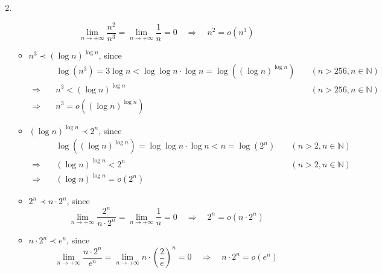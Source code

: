 \documentclass[12pt,a4paper]{article}
\makeatletter
\newtheorem*{solution}{Solution}
\theoremstyle{definition}
\renewenvironment{solution}[1][Solution] {\par\pushQED{\qed}\normalfont\topsep6\p@\@plus6\p@\relax\trivlist\item[\hskip\labelsep\bfseries#1\@addpunct{.}]\ignorespaces}{\popQED\endtrivlist\@endpefalse} \makeatother
\makeatother
\begin{document}
\begin{enumerate}
\begin{solution}
\begin{itemize}
            \begin{displaymath}
            \lim_{n \rightarrow +\infty} \frac{n^2}{n^3} = \lim_{n \rightarrow +\infty} \frac{1}{n} = 0 \quad \Longrightarrow \quad n^2 = o(n^3)
            \end{displaymath}
        \item $n^3 \prec (\log{n})^{\log{n}}$, since
            \begin{displaymath}
            \begin{aligned}
            & \quad \log{(n^3)} = 3\log{n} < \log{\log{n}} \cdot \log{n} = \log{\left((\log{n})^{\log{n}}\right)}\quad &(n > 256, n \in \mathbb{N})\\
            \Longrightarrow & \quad n^3 < (\log{n})^{\log{n}} \quad &(n > 256, n \in \mathbb{N})\\
            \Longrightarrow & \quad n^3 = o((\log{n})^{\log{n}})
            \end{aligned}
            \end{displaymath}
        \item $(\log{n})^{\log{n}} \prec 2^n$, since
            \begin{displaymath}
            \begin{aligned}
            & \quad \log{\left((\log{n})^{\log{n}}\right)} = \log{\log{n}} \cdot \log{n} < n = \log{(2^n)} \quad & (n > 2, n \in \mathbb{N}) \\
            \Longrightarrow & \quad (\log{n})^{\log{n}} < 2^n \quad & (n > 2, n \in \mathbb{N}) \\
            \Longrightarrow & \quad (\log{n})^{\log{n}} = o(2^n)
            \end{aligned}
            \end{displaymath}
        \item $2^n \prec n \cdot 2^n$, since
            \begin{displaymath}
            \lim_{n \rightarrow +\infty} \frac{2^n}{n \cdot 2^n} = \lim_{n \rightarrow +\infty} \frac{1}{n} = 0 \quad \Longrightarrow \quad 2^n = o(n\cdot 2^n)
            \end{displaymath}
        \item $n\cdot 2^n \prec e^n$, since
            \begin{displaymath}
            \lim_{n \rightarrow +\infty} \frac{n\cdot 2^n}{e^n} = \lim_{n \rightarrow +\infty} n\cdot \left(\frac{2}{e}\right)^n = 0 \quad \Longrightarrow \quad n \cdot 2^n = o(e^n)
            \end{displaymath}

\end{itemize}
\end{solution}
\end{enumerate}
\end{document}
